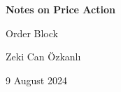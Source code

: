 \documentclass[article]{report}
\begin{document}
\onehalfspacing

\begin{titlepage}
    \begin{center}
        \vspace*{3cm}
            
        \Huge
        \textbf{Notes on Price Action}

        \vspace{0.5cm}
        
        \Large
        Order Block 
            
        \vspace{6cm}

        \LARGE
        Zeki Can Özkanlı
                
        \vfill
            
        \vspace{0.8cm}

        \Large
        9 August 2024
        
        \vspace{0.5cm}
        
    \end{center}
\end{titlepage}

\tableofcontents







 
\end{document}
